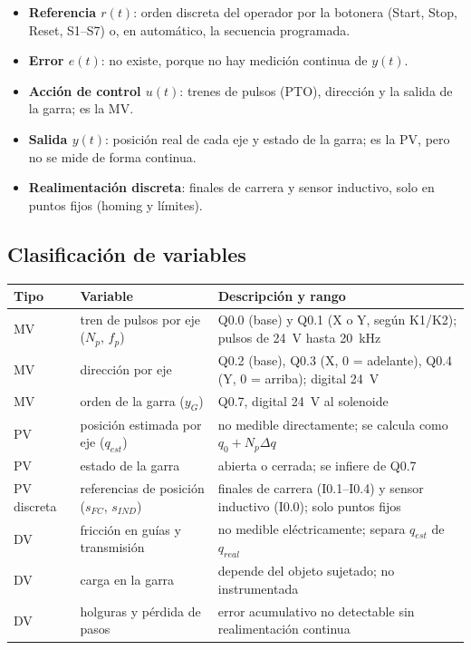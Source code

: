 \documentclass[a4paper,11pt]{article}
\begin{document}
\begin{itemize}
\item \textbf{Referencia $r(t)$}: orden discreta del operador por la botonera (Start, Stop, Reset, S1--S7) o, en automático, la secuencia programada.
\item \textbf{Error $e(t)$}: no existe, porque no hay medición continua de $y(t)$.
\item \textbf{Acción de control $u(t)$}: trenes de pulsos (PTO), dirección y la salida de la garra; es la MV.
\item \textbf{Salida $y(t)$}: posición real de cada eje y estado de la garra; es la PV, pero no se mide de forma continua.
\item \textbf{Realimentación discreta}: finales de carrera y sensor inductivo, solo en puntos fijos (homing y límites).
\end{itemize}

\subsection{Clasificación de variables}
\begin{center}\small
\begin{longtable}{>{\raggedright}p{1.4cm} >{\raggedright}p{4.2cm} >{\raggedright\arraybackslash}p{8.6cm}}
\toprule
\textbf{Tipo} & \textbf{Variable} & \textbf{Descripción y rango}\\
\midrule\endhead
MV & tren de pulsos por eje ($N_p$, $f_p$) & Q0.0 (base) y Q0.1 (X o Y, según K1/K2); pulsos de 24~V hasta 20~kHz\\
MV & dirección por eje & Q0.2 (base), Q0.3 (X, 0 = adelante), Q0.4 (Y, 0 = arriba); digital 24~V\\
MV & orden de la garra ($y_G$) & Q0.7, digital 24~V al solenoide\\
PV & posición estimada por eje ($q_{est}$) & no medible directamente; se calcula como $q_0 + N_p\Delta q$\\
PV & estado de la garra & abierta o cerrada; se infiere de Q0.7\\
PV discreta & referencias de posición ($s_{FC}$, $s_{IND}$) & finales de carrera (I0.1--I0.4) y sensor inductivo (I0.0); solo puntos fijos\\
DV & fricción en guías y transmisión & no medible eléctricamente; separa $q_{est}$ de $q_{real}$\\
DV & carga en la garra & depende del objeto sujetado; no instrumentada\\
DV & holguras y pérdida de pasos & error acumulativo no detectable sin realimentación continua\\
\bottomrule
\end{longtable}\end{center}
\end{document}
